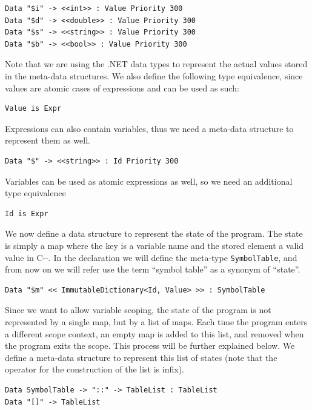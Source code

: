 \begin{lstlisting}
Data "$i" -> <<int>> : Value Priority 300
Data "$d" -> <<double>> : Value Priority 300
Data "$s" -> <<string>> : Value Priority 300
Data "$b" -> <<bool>> : Value Priority 300
\end{lstlisting}

\noindent
Note that we are using the .NET data types to represent the actual values stored in the meta-data structures. We also define the following type equivalence, since values are atomic cases of expressions and can be used as such:

\begin{lstlisting}
Value is Expr
\end{lstlisting}

\noindent
Expressions can also contain variables, thus we need a meta-data structure to represent them as well.

\begin{lstlisting}
Data "$" -> <<string>> : Id Priority 300
\end{lstlisting}

\noindent
Variables can be used as atomic expressions as well, so we need an additional type equivalence

\begin{lstlisting}
Id is Expr
\end{lstlisting}

\noindent
We now define a data structure to represent the state of the program. The state is simply a map where the key is a variable name and the stored element a valid value in C-{}-. In the declaration we will define the meta-type \texttt{SymbolTable}, and from now on we will refer use the term ``symbol table'' as a synonym of ``state''.

\begin{lstlisting}
Data "$m" << ImmutableDictionary<Id, Value> >> : SymbolTable 
\end{lstlisting}

\noindent
Since we want to allow variable scoping, the state of the program is not represented by a single map, but by a list of maps. Each time the program enters a different scope context, an empty map is added to this list, and removed when the program exits the scope. This process will be further explained below. We define a meta-data structure to represent this list of states (note that the operator for the construction of the list is infix).

\begin{lstlisting}
Data SymbolTable -> "::" -> TableList : TableList
Data "[]" -> TableList
\end{lstlisting}

